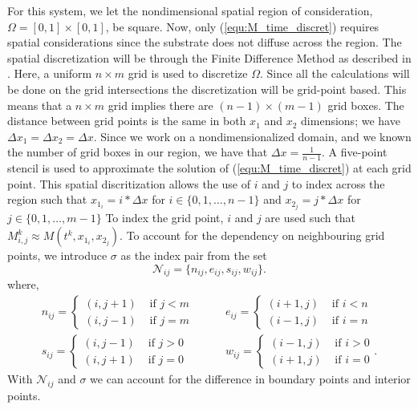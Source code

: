 For this system, we let the nondimensional spatial region of consideration, $\Omega = [0,1]\times [0,1]$, be square.
Now, only (\ref{equ:M_time_discret}) requires spatial considerations since the substrate does not diffuse across the region.
The spatial discretization will be through the Finite Difference Method as described in \cite{saad2003iterativeMethod}.
Here, a uniform $n \times m$ grid is used to discretize $\Omega$.
Since all the calculations will be done on the grid intersections the discretization will be grid-point based.
This means that a $n \times m$ grid implies there are $(n-1) \times (m-1)$ grid boxes.
The distance between grid points is the same in both $x_1$ and $x_2$ dimensions; we have $\Delta x_1 = \Delta x_2 = \Delta x$.
Since we work on a nondimensionalized domain, and we known the number of grid boxes in our region, we have that $\Delta x = \frac{1}{n-1}$.
A five-point stencil is used to approximate the solution of (\ref{equ:M_time_discret}) at each grid point.
This spatial discritization allows the use of $i$ and $j$ to index across the region such that $x_{1_i} = i * \Delta x$ for $i \in \{ 0, 1, \ldots, n-1 \}$ and $x_{2_j} = j * \Delta x$ for $j \in \{ 0, 1, \ldots, m-1 \}$
To index the grid point, $i$ and $j$ are used such that $M^{k}_{i,j} \approx M(t^{k}, x_{1_i}, x_{2_j})$.
To account for the dependency on neighbouring grid points, we introduce $\sigma$ as the index pair from the set 
\begin{equation}\label{equ:neighbour}
  \mathcal{N}_{ij} = \{n_{ij}, e_{ij}, s_{ij}, w_{ij}\}.
\end{equation}
where, 
\begin{equation}
  \begin{aligned}
    n_{ij} = \begin{cases} 
      (i,j+1)  & \text{ if } j < m \\
      (i,j-1)  & \text{ if } j = m \end{cases}
    & \qquad 
    e_{ij} = \begin{cases}
      (i+1,j)  & \text{ if } i < n \\
      (i-1,j)  & \text{ if } i = n \end{cases}
    \\
    s_{ij} = \begin{cases}
      (i,j-1)  & \text{ if } j > 0 \\
      (i,j+1)  & \text{ if } j = 0 \end{cases}
    & \qquad 
    w_{ij} = \begin{cases}
      (i-1,j)  & \text{ if } i > 0\\
      (i+1,j)  & \text{ if } i = 0 \end{cases}.
  \end{aligned}
\end{equation}
With $\mathcal{N}_{ij}$ and $\sigma$ we can account for the difference in boundary points and interior points.

